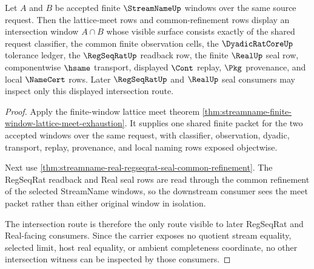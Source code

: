 \begin{theorem}
\label{thm:streamname-finite-window-intersection}
Let $A$ and $B$ be accepted finite $\StreamNameUp$ windows over the same source request. Then the lattice-meet rows and common-refinement rows display an intersection window $A \cap B$ whose visible surface consists exactly of the shared request classifier, the common finite observation cells, the $\DyadicRatCoreUp$ tolerance ledger, the $\RegSeqRatUp$ readback row, the finite $\RealUp$ seal row, componentwise $\hsame$ transport, displayed $\Cont$ replay, $\Pkg$ provenance, and local $\NameCert$ rows. Later $\RegSeqRatUp$ and $\RealUp$ seal consumers may inspect only this displayed intersection route.
\end{theorem}
\begin{proof}
Apply the finite-window lattice meet theorem \autoref{thm:streamname-finite-window-lattice-meet-exhaustion}. It supplies one shared finite packet for the two accepted windows over the same request, with classifier, observation, dyadic, transport, replay, provenance, and local naming rows exposed objectwise.

Next use \autoref{thm:streamname-real-regseqrat-seal-common-refinement}. The RegSeqRat readback and Real seal rows are read through the common refinement of the selected StreamName windows, so the downstream consumer sees the meet packet rather than either original window in isolation.

The intersection route is therefore the only route visible to later RegSeqRat and Real-facing consumers. Since the carrier exposes no quotient stream equality, selected limit, host real equality, or ambient completeness coordinate, no other intersection witness can be inspected by those consumers.
\end{proof}
